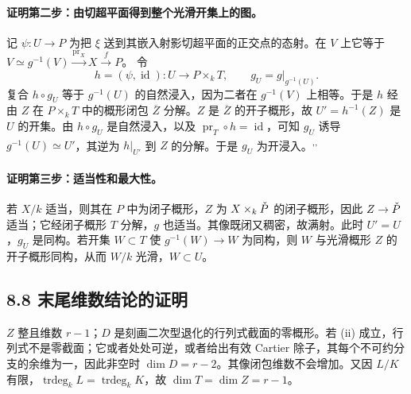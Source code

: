 \paragraph{证明第二步：由切超平面得到整个光滑开集上的图。}
记 $\psi:U\to P$ 为把 $\xi$ 送到其嵌入射影切超平面的正交点的态射。在 $V$ 上它等于
$V\simeq g^{-1}(V)\xrightarrow{\operatorname{pr}_X}X\xrightarrow{f}P$。
令
\[
 h=(\psi,\operatorname{id}):U\longrightarrow P\times_k T,
 \qquad g_U=g|_{g^{-1}(U)}.
\]
复合 $h\circ g_U$ 等于 $g^{-1}(U)$ 的自然浸入，因为二者在 $g^{-1}(V)$ 上相等。于是 $h$ 经由 $Z$ 在 $P\times_k T$ 中的概形闭包 $\overline Z$ 分解。$Z$ 是 $\overline Z$ 的开子概形，故 $U'=h^{-1}(Z)$ 是 $U$ 的开集。由 $h\circ g_U$ 是自然浸入，以及 $\operatorname{pr}_T\circ h=\operatorname{id}$，可知 $g_U$ 诱导 $g^{-1}(U)\simeq U'$，其逆为 $h|_{U'}$ 到 $Z$ 的分解。于是 $g_U$ 为开浸入。\textsuperscript{,}\textsuperscript{,}

\paragraph{证明第三步：适当性和最大性。}
若 $X/k$ 适当，则其在 $P$ 中为闭子概形，$Z$ 为 $X\times_k\check P$ 的闭子概形，因此 $Z\to\check P$ 适当；它经闭子概形 $T$ 分解，$g$ 也适当。其像既闭又稠密，故满射。此时 $U'=U$，$g_U$ 是同构。若开集 $W\subset T$ 使 $g^{-1}(W)\to W$ 为同构，则 $W$ 与光滑概形 $Z$ 的开子概形同构，从而 $W/k$ 光滑，$W\subset U$。

\subsection*{8.8 末尾维数结论的证明}
$Z$ 整且维数 $r-1$；$D$ 是刻画二次型退化的行列式截面的零概形。若 (ii) 成立，行列式不是零截面；它或者处处可逆，或者给出有效 Cartier 除子，其每个不可约分支的余维为一，因此非空时 $\dim D=r-2$。其像闭包维数不会增加。又因 $L/K$ 有限，$\operatorname{trdeg}_k L=\operatorname{trdeg}_k K$，故 $\dim T=\dim Z=r-1$。
\par\endgroup

